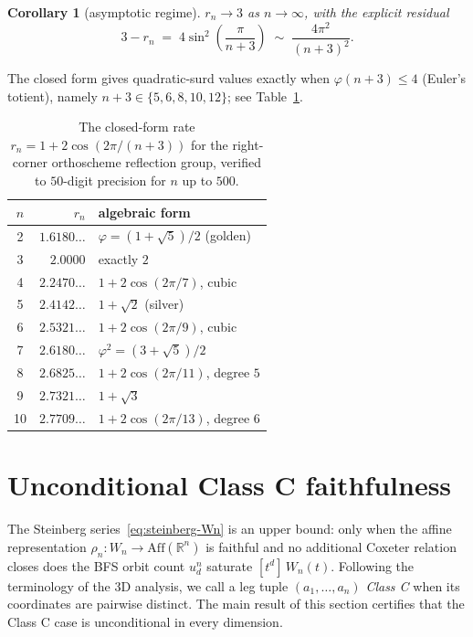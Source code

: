 \documentclass[11pt,a4paper]{article}
\newtheorem{corollary}[theorem]{Corollary}
\theoremstyle{remark}
\theoremstyle{plain}
\begin{document}
\begin{corollary}[asymptotic regime]
$r_n \to 3$ as $n \to \infty$, with the explicit residual
\[
3 - r_n  \;=\;  4 \sin^2\!\left(\frac{\pi}{n+3}\right)
         \;\sim\;  \frac{4 \pi^2}{(n + 3)^2}.
\]
\end{corollary}

The closed form gives quadratic-surd values exactly when
$\varphi(n+3) \le 4$ (Euler's totient), namely $n + 3 \in
\{5, 6, 8, 10, 12\}$; see Table~\ref{tab:n-dim-rates}.

\begin{table}[ht!]
\centering
\small
\renewcommand{\arraystretch}{1.15}
\begin{tabular}{c r l}
\toprule
$n$ & $r_n$ & algebraic form \\
\midrule
2  & $1.6180\ldots$ & $\varphi = (1+\sqrt 5)/2$ (golden) \\
3  & $2.0000$       & exactly $2$ \\
4  & $2.2470\ldots$ & $1 + 2\cos(2\pi/7)$, cubic \\
5  & $2.4142\ldots$ & $1 + \sqrt 2$ (silver) \\
6  & $2.5321\ldots$ & $1 + 2\cos(2\pi/9)$, cubic \\
7  & $2.6180\ldots$ & $\varphi^2 = (3+\sqrt 5)/2$ \\
8  & $2.6825\ldots$ & $1 + 2\cos(2\pi/11)$, degree $5$ \\
9  & $2.7321\ldots$ & $1 + \sqrt 3$ \\
10 & $2.7709\ldots$ & $1 + 2\cos(2\pi/13)$, degree $6$ \\
\bottomrule
\end{tabular}
\caption{The closed-form rate $r_n = 1 + 2\cos(2\pi/(n+3))$ for
the right-corner orthoscheme reflection group, verified to $50$-digit
precision for $n$ up to $500$.}
\label{tab:n-dim-rates}
\end{table}

\section{Unconditional Class C faithfulness}\label{sec:classC}

The Steinberg series~\eqref{eq:steinberg-Wn} is an upper bound: only
when the affine representation $\rho_n : W_n \to \mathrm{Aff}(\mathbb{R}^n)$
is faithful and no additional Coxeter relation closes does the BFS
orbit count $u_d^n$ saturate $[t^d]\, W_n(t)$.  Following the
terminology of the 3D analysis, we call a leg tuple
$(a_1, \ldots, a_n)$ \emph{Class C} when its coordinates are
pairwise distinct.  The main result of this section certifies that
the Class C case is unconditional in every dimension.
\end{document}
